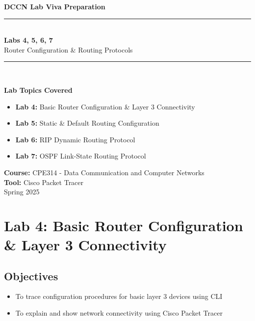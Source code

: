 \documentclass[12pt,a4paper]{article}
\begin{document}
\begin{titlepage}
\centering
\vspace*{0.5cm}
{\Large\color{primary}\textbf{DCCN Lab Viva Preparation}}\\[0.3cm]
\rule{\textwidth}{2pt}\\[0.5cm]
{\Huge\bfseries\color{primary} Labs 4, 5, 6, 7}\\[0.3cm]
{\Large Router Configuration \& Routing Protocols}\\[0.2cm]
\rule{\textwidth}{2pt}\\[1.5cm]

\begin{tcolorbox}[colback=light,colframe=primary,rounded corners,width=0.8\textwidth]
\begin{center}
\textbf{\large Lab Topics Covered}\\[0.3cm]
\begin{itemize}[leftmargin=*, itemsep=5pt]
    \item \textbf{Lab 4:} Basic Router Configuration \& Layer 3 Connectivity
    \item \textbf{Lab 5:} Static \& Default Routing Configuration
    \item \textbf{Lab 6:} RIP Dynamic Routing Protocol
    \item \textbf{Lab 7:} OSPF Link-State Routing Protocol
\end{itemize}
\end{center}
\end{tcolorbox}

\vfill
{\large \textbf{Course:} CPE314 - Data Communication and Computer Networks}\\[0.2cm]
{\large \textbf{Tool:} Cisco Packet Tracer}\\[0.3cm]
{\large Spring 2025}
\end{titlepage}

\tableofcontents
\newpage

\section{Lab 4: Basic Router Configuration \& Layer 3 Connectivity}

\subsection{Objectives}
\begin{itemize}[noitemsep]
    \item To trace configuration procedures for basic layer 3 devices using CLI
    \item To explain and show network connectivity using Cisco Packet Tracer
\end{itemize}
\end{document}
